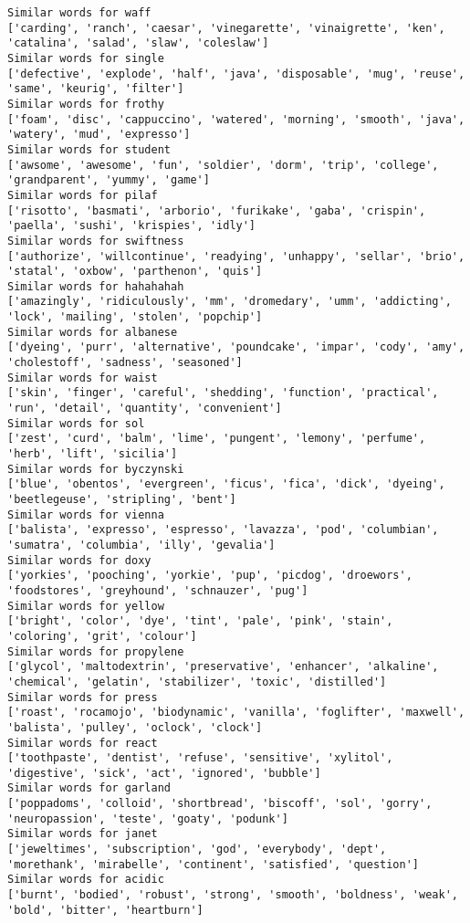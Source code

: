 \documentclass[11pt]{article}
\begin{document}
\begin{Verbatim}[commandchars=\\\{\}]
Similar words for waff
['carding', 'ranch', 'caesar', 'vinegarette', 'vinaigrette', 'ken', 'catalina', 'salad', 'slaw', 'coleslaw']
Similar words for single
['defective', 'explode', 'half', 'java', 'disposable', 'mug', 'reuse', 'same', 'keurig', 'filter']
Similar words for frothy
['foam', 'disc', 'cappuccino', 'watered', 'morning', 'smooth', 'java', 'watery', 'mud', 'expresso']
Similar words for student
['awsome', 'awesome', 'fun', 'soldier', 'dorm', 'trip', 'college', 'grandparent', 'yummy', 'game']
Similar words for pilaf
['risotto', 'basmati', 'arborio', 'furikake', 'gaba', 'crispin', 'paella', 'sushi', 'krispies', 'idly']
Similar words for swiftness
['authorize', 'willcontinue', 'readying', 'unhappy', 'sellar', 'brio', 'statal', 'oxbow', 'parthenon', 'quis']
Similar words for hahahahah
['amazingly', 'ridiculously', 'mm', 'dromedary', 'umm', 'addicting', 'lock', 'mailing', 'stolen', 'popchip']
Similar words for albanese
['dyeing', 'purr', 'alternative', 'poundcake', 'impar', 'cody', 'amy', 'cholestoff', 'sadness', 'seasoned']
Similar words for waist
['skin', 'finger', 'careful', 'shedding', 'function', 'practical', 'run', 'detail', 'quantity', 'convenient']
Similar words for sol
['zest', 'curd', 'balm', 'lime', 'pungent', 'lemony', 'perfume', 'herb', 'lift', 'sicilia']
Similar words for byczynski
['blue', 'obentos', 'evergreen', 'ficus', 'fica', 'dick', 'dyeing', 'beetlegeuse', 'stripling', 'bent']
Similar words for vienna
['balista', 'expresso', 'espresso', 'lavazza', 'pod', 'columbian', 'sumatra', 'columbia', 'illy', 'gevalia']
Similar words for doxy
['yorkies', 'pooching', 'yorkie', 'pup', 'picdog', 'droewors', 'foodstores', 'greyhound', 'schnauzer', 'pug']
Similar words for yellow
['bright', 'color', 'dye', 'tint', 'pale', 'pink', 'stain', 'coloring', 'grit', 'colour']
Similar words for propylene
['glycol', 'maltodextrin', 'preservative', 'enhancer', 'alkaline', 'chemical', 'gelatin', 'stabilizer', 'toxic', 'distilled']
Similar words for press
['roast', 'rocamojo', 'biodynamic', 'vanilla', 'foglifter', 'maxwell', 'balista', 'pulley', 'oclock', 'clock']
Similar words for react
['toothpaste', 'dentist', 'refuse', 'sensitive', 'xylitol', 'digestive', 'sick', 'act', 'ignored', 'bubble']
Similar words for garland
['poppadoms', 'colloid', 'shortbread', 'biscoff', 'sol', 'gorry', 'neuropassion', 'teste', 'goaty', 'podunk']
Similar words for janet
['jeweltimes', 'subscription', 'god', 'everybody', 'dept', 'morethank', 'mirabelle', 'continent', 'satisfied', 'question']
Similar words for acidic
['burnt', 'bodied', 'robust', 'strong', 'smooth', 'boldness', 'weak', 'bold', 'bitter', 'heartburn']

\end{Verbatim}
\end{document}
